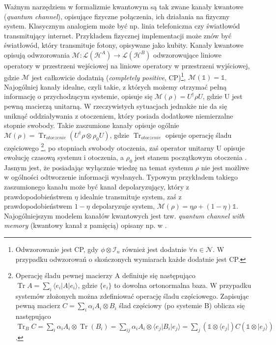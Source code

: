 \documentclass[10pt]{article} %
\DeclareMathOperator{\Trs}{Tr}
\newcommand{\Hx}[1]{\mathcal{H}^{#1}}
\newcommand{\Ket}[1]{|#1\rangle}
\newcommand{\Bra}[1]{\langle#1|}
\newcommand{\I}{\mathbb{1}}
\begin{document}
Ważnym narzędziem w formalizmie kwantowym są tak zwane kanały kwantowe (\textit{quantum channel}), opisujące fizyczne połączenia, ich działania na fizyczny system. Klasycznym analogiem może być np. linia telefoniczna czy światłowód transmitujący internet. 
Przykładem fizycznej implementacji może znów być światłowód, który transmituje fotony, opisywane jako kubity. 
Kanały kwantowe opisują odwzorowania $\mathcal{M}: \mathcal{L}(\Hx{A}) \to \mathcal{L}({\Hx{B}})$ odwzorowujące liniowe operatory w przestrzeni wejściowej na liniowe operatory w przestrzeni wyjściowej, gdzie $\mathcal{M}$ jest całkowicie dodatnią (\textit{completely positive}, CP)\footnote
{
Odwzorowanie jest CP, gdy $\phi \otimes \mathcal{I}_n$ również jest dodatnie $\forall n \in \mathcal{N}$. W przypadku odwzorowań o skończonych wymiarach każde dodatnie jest CP.
}, $\mathcal{M}(\mathbb{1}) = \mathbb{1}$. Najogólniej kanały idealne, czyli takie, z których możemy otrzymać pełną informację o przychodzącym systemie, opisuje się $\mathcal{M}(\rho) = U^\dag \rho U$, gdzie U jest pewną macierzą unitarną. W rzeczywistych sytuacjach jednakże nie da się uniknąć
oddziaływania z otoczeniem, który posiada dodatkowe niemierzalne stopnie swobody. Takie zaszumione kanały opisuje ogólnie $\mathcal{M}(\rho) = \Trs_{otoczenie}(U^\dag \rho \otimes \rho_0 U)$, gdzie $\Trs_{otoczenie}$ opisuje operację śladu częściowego
\footnote{
Operację śladu pewnej macierzy A definiuje się następująco $\Trs A = \sum_i \Bra{e_i} A \Ket{e_i}$, gdzie $\{e_i\}$ to dowolna ortonormalna baza.
W przypadku systemów złożonych można zdefiniować operację śladu częściowego. Zapisując pewną macierz $C = \sum_i \alpha_i A_i \otimes B_i$ ślad częściowy (po systemie B) oblicza się następująco $\Trs_B C = \sum_i \alpha_i A_i \otimes \Trs(B_i) = \sum_{ij} \alpha_i A_i \otimes \Bra{e_j}B_i\Ket{e_j} = \sum_j (\I \otimes \Bra{e_j}) C (\I \otimes \Ket{e_j})$.
}, po stopniach swobody otoczenia, zaś operator unitarny U
opisuje ewolucję czasową systemu i otoczenia, a $\rho_0$ jest stanem początkowym otoczenia \cite{fund}. Jasnym jest, że posiadając wyłącznie wiedzę na temat systemu $\rho$ nie jest możliwe w ogólności odtworzenie informacji wysłanych.
Typowym przykładem takiego zaszumionego kanału może być kanał depolaryzujący, który z prawdopodobieństwem $\eta$ idealnie transmituje system, zaś z prawdopodobieństwem $1-\eta$ depolaryzuje system, $\mathcal{M}(\rho) = \eta\rho+(1-\eta)\I$. Najogólniejszym modelem kanałów kwantowych jest tzw.
\textit{quantum channel with memory} (kwantowy kanał z pamięcią) opisany np. w \cite{memory}.
\end{document}
